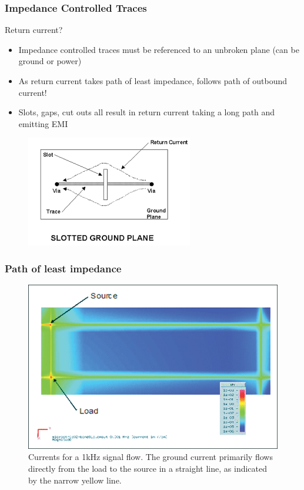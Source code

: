 \documentclass[t]{beamer}
\begin{document}
\begin{frame}
\frametitle{Impedance Controlled Traces}
Return current?\\
\begin{itemize}
	\item Impedance controlled traces must be referenced to an unbroken plane (can be ground or power)
	\item As return current takes path of least impedance, follows path of outbound current!
	\item Slots, gaps, cut outs all result in return current taking a long path and emitting EMI
\end{itemize}
\begin{figure}
	\includegraphics[width=0.5\linewidth]{slot.png}
\end{figure}
\end{frame}
\begin{frame}
	\frametitle{Path of least impedance}
	\begin{figure}
		\includegraphics[width=0.8\linewidth]{1khz.png}
		\caption{Currents for a 1kHz signal flow. The ground current primarily flows directly from the load to the source in a straight line, as indicated by the narrow yellow line.}
	\end{figure}
\end{frame}
\end{document}
